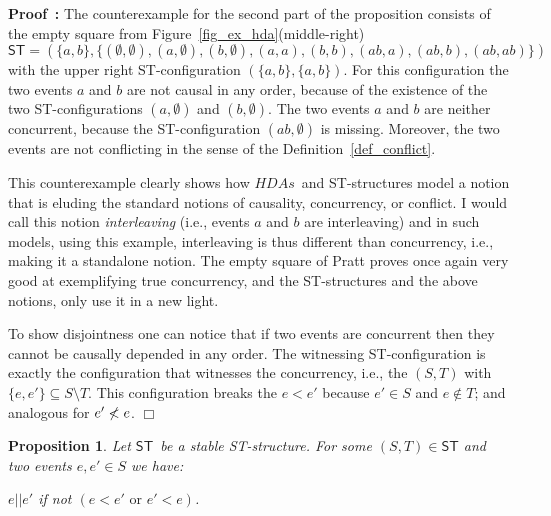 \documentclass[submission,copyright,creativecommons]{eptcs}
\newtheorem{proposition}[theorem]{Proposition}
\newenvironment{proof}[1][\!\!\,]{\vspace{1ex}\noindent\textbf{Proof #1: }}{\hfill$\Box$\vspace{2ex}}
\newcommand\HDAs{\ensuremath{\mathit{HDAs}}}
\newcommand\ST{\ensuremath{\mathsf{ST}}}
\newcommand\concurr{\ensuremath{||}}
\newcommand\causes{\ensuremath{<}}
\begin{document}
\begin{proof}
The counterexample for the second part of the proposition consists of the empty square from Figure~\ref{fig_ex_hda}(middle-right) 
\[
\ST=(\{a,b\},\{(\emptyset,\emptyset),(a,\emptyset),(b,\emptyset),(a,a),(b,b),(ab,a),(ab,b),(ab,ab)\})
\]
with the upper right ST-configuration $(\{a,b\},\{a,b\})$. For this configuration the two events $a$ and $b$ are not causal in any order, because of the existence of the two ST-configurations $(a,\emptyset)$ and $(b,\emptyset)$. The two events $a$ and $b$ are neither concurrent, because the ST-configuration $(ab,\emptyset)$ is missing. Moreover, the two events are not conflicting in the sense of the Definition~\ref{def_conflict}.

This counterexample clearly shows how \HDAs\ and ST-structures model a notion that is eluding the standard notions of causality, concurrency, or conflict. I would call this notion \textit{interleaving} (i.e., events $a$ and $b$ are interleaving) and in such models, using this example, interleaving is thus different than concurrency, i.e., making it a standalone notion. The empty square of Pratt proves once again very good at exemplifying true concurrency, and the ST-structures and the above notions, only use it in a new light.

To show disjointness one can notice that if two events are concurrent then they cannot be causally depended in any order. The witnessing ST-configuration is exactly the configuration that witnesses the concurrency, i.e., the $(S,T)$ with $\{e,e'\}\subseteq S\setminus T$. This configuration breaks the $e\causes e'$ because $e'\in S$ and $e\not\in T$; and analogous for $e'\not\causes e$.
\end{proof}



\begin{proposition}\label{prop_concCausalStable}
Let \ST\ be a \emph{stable} ST-structure. For some $(S,T)\in\ST$ and two events $e,e'\in S$ we have: 

\centerline{$e\concurr e'$ if not $(e\causes e'\mbox{ or }e'\causes e)$.}
\end{proposition}
\end{document}
